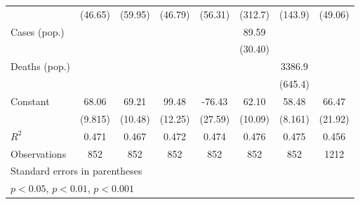 \documentclass{article}
\begin{document}
{\begin{longtable}{l*{7}{c}}
                &  (46.65)         &  (59.95)         &  (46.79)         &  (56.31)         &  (312.7)         &  (143.9)         &  (49.06)         \\
Cases (pop.)    &                  &                  &                  &                  &    89.59\sym{*}  &                  &                  \\
                &                  &                  &                  &                  &  (30.40)         &                  &                  \\
Deaths (pop.)   &                  &                  &                  &                  &                  &   3386.9\sym{**} &                  \\
                &                  &                  &                  &                  &                  &  (645.4)         &                  \\
Constant        &    68.06\sym{***}&    69.21\sym{**} &    99.48\sym{***}&   -76.43\sym{*}  &    62.10\sym{**} &    58.48\sym{***}&    66.47\sym{*}  \\
                &  (9.815)         &  (10.48)         &  (12.25)         &  (27.59)         &  (10.09)         &  (8.161)         &  (21.92)         \\
\hline
\(R^{2}\)       &    0.471         &    0.467         &    0.472         &    0.474         &    0.476         &    0.475         &    0.456         \\
Observations    &      852         &      852         &      852         &      852         &      852         &      852         &     1212         \\
\hline\hline
\multicolumn{8}{l}{\footnotesize Standard errors in parentheses}\\
\multicolumn{8}{l}{\footnotesize \sym{*} \(p<0.05\), \sym{**} \(p<0.01\), \sym{***} \(p<0.001\)}\\
\end{longtable}
}
\end{document}
